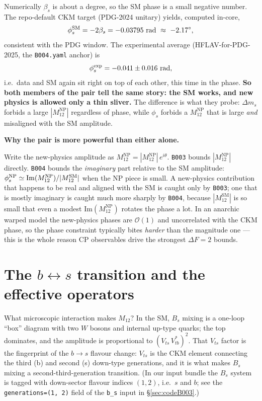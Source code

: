 \documentclass[11pt]{article}
\newenvironment{callout}[1]{%
  \par\medskip\begin{shaded}\noindent\textbf{#1}\par\smallskip}{\end{shaded}\medskip}
\newcommand{\code}[1]{\texttt{#1}}
\newcommand{\Bs}{B_s}
\newcommand{\dms}{\Delta m_s}
\newcommand{\phis}{\phi_s}
\newcommand{\Mtwelve}{M_{12}}
\newcommand{\MtwelveNP}{M_{12}^{\mathrm{NP}}}
\newcommand{\MtwelveSM}{M_{12}^{\mathrm{SM}}}
\newcommand{\Vts}{V_{ts}}
\newcommand{\betas}{\beta_s}
\theoremstyle{definition}
\begin{document}
Numerically $\betas$ is about a degree, so the SM phase is a small negative
number. The repo-default CKM target (PDG-2024 unitary) yields, computed in-core,
\begin{equation}
\phis^{\rm SM} = -2\betas = -0.03795\ \text{rad}\ \approx\ -2.17^\circ,
\label{eq:phissmnum}
\end{equation}
consistent with the PDG window. The experimental average (HFLAV-for-PDG-2025,
the \code{B004.yaml} anchor) is
\begin{equation}
\phis^{\rm exp} = -0.041 \pm 0.016\ \text{rad},
\label{eq:phisexp}
\end{equation}
i.e.\ data and SM again sit right on top of each other, this time in the phase.
\textbf{So both members of the pair tell the same story: the SM works, and new
physics is allowed only a thin sliver.} The difference is what they probe: $\dms$
forbids a large $|\MtwelveNP|$ regardless of phase, while $\phis$ forbids a
$\MtwelveNP$ that is large \emph{and} misaligned with the SM amplitude.

\begin{callout}{Why the pair is more powerful than either alone.}
Write the new-physics amplitude as $\MtwelveNP = |\MtwelveNP|\,e^{i\theta}$.
\code{B003} bounds $|\MtwelveNP|$ directly. \code{B004} bounds the
\emph{imaginary} part relative to the SM amplitude: $\phis^{\rm NP}\simeq
\mathrm{Im}(\MtwelveNP)/|\MtwelveSM|$ when the NP piece is small. A
new-physics contribution that happens to be real and aligned with the SM is
caught only by \code{B003}; one that is mostly imaginary is caught much more
sharply by \code{B004}, because $|\MtwelveSM|$ is so small that even a modest
$\mathrm{Im}(\MtwelveNP)$ rotates the phase a lot. In an anarchic warped model
the new-physics phases are $\mathcal{O}(1)$ and uncorrelated with the CKM phase,
so the phase constraint typically bites \emph{harder} than the magnitude one ---
this is the whole reason CP observables drive the strongest $\Delta F=2$ bounds.
\end{callout}

\section{The $b\!\leftrightarrow\!s$ transition and the effective operators}
\label{sec:operators}

What microscopic interaction makes $\Mtwelve$? In the SM, $\Bs$ mixing is a
one-loop ``box'' diagram with two $W$ bosons and internal up-type quarks; the
top dominates, and the amplitude is proportional to $(\Vts\,V_{tb}^*)^2$. That
$\Vts$ factor is the fingerprint of the $b\!\to\! s$ flavour change: $\Vts$ is
the CKM element connecting the third (b) and second (s) down-type generations,
and it is what makes $\Bs$ mixing a second-third-generation transition. (In our
input bundle the $\Bs$ system is tagged with down-sector flavour indices
$(1,2)$, i.e.\ $s$ and $b$; see the \code{generations=(1, 2)} field of the
\code{b\_s} input in \S\ref{sec:codeB003}.)
\end{document}
